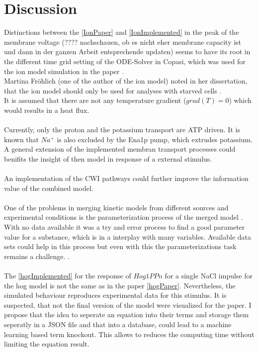 \section{Discussion}
Distinctions between the \ref{IonPaper} and \ref{IonImplemented} in the peak of the membrane voltage (???? nachschauen, ob es nicht eher membrane capacity ist und dann in der ganzen Arbeit entsprechende updaten) seems to have its root in the different time grid setting of the ODE-Solver in Copasi, which was used for the ion model simulation in the paper \cite{Gerber_2016}.\\
Martina Fröhlich (one of the author of the ion model) noted in her dissertation, that the ion model should only be used for analyses with starved cells \cite{martinafroehlich}.\\
It is assumed that there are not any temperature gradient ($grad(T)=0$) which would results in a heat flux.\\\\
Currently, only the proton and the potassium transport are ATP driven. It is known that $Na^+$ is also excluded by the Ena1p pump, which extrudes potassium. A general extension of the implemented membran transport processes could benifits the insight of then model in response of a external stimulus.\\\\
An implementation of the CWI pathways could further improve the information value of the combined model.\\\\
One of the problems in merging kinetic models from different sources and experimental conditions is the parameterization process of the merged model \cite{Wang2017}. With no data available it was a try and error process to find a good parameter value for a substance, which is in a interplay with many variables. Available data sets could help in this process but even with this the parameterizations task remains a challenge. \cite{Ke_2013}. \\\\
The  \ref{hogImplemented} for the response of $Hog1PPn$ for a single NaCl impulse for the hog model is not the same as in the paper \ref{hogPaper}. Nevertheless, the simulated behaviour reproduces experimental data for this stimulus. It is suspected, that not the final version of the model were visualized for the paper.
I propose that the idea to seperate an equation into their terms and storage them seperatly in a JSON file and that into a database, could lead to a machine learning based term knockout. This allows to reduces the computing time without limiting the equation result.\\

